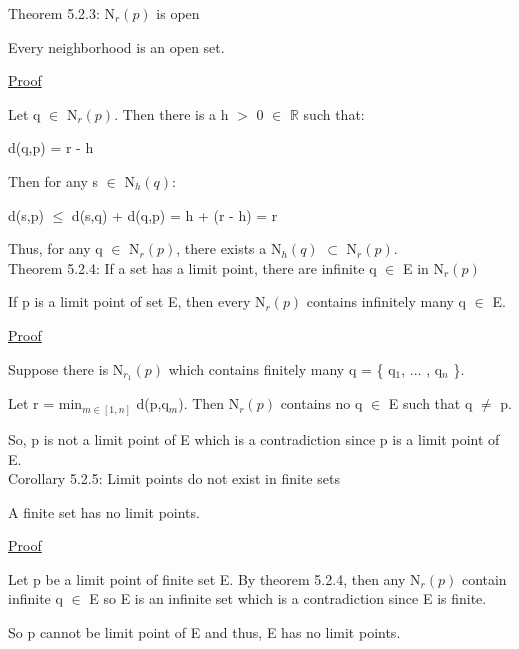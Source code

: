 { \color{red} Theorem 5.2.3: N$_r(p)$ is open } 

	\begin{adjustbox}{minipage=14cm, right}
		Every neighborhood is an open set.
	\end{adjustbox}

{ \color{magenta} \underline{Proof} } 
	
	Let q $\in$ N$_r(p)$. Then there is a h $>$ 0 $\in$ $\mathbb{R}$ such that:

	\qquad d(q,p) = r - h

	Then for any s $\in$ N$_h(q)$:

	\qquad d(s,p) $\leq$  d(s,q) + d(q,p) = h + (r - h) = r

	Thus, for any q $\in$ N$_r(p)$, there exists a N$_h(q)$ $\subset$ N$_r(p)$. \\

{ \color{red} Theorem 5.2.4: If a set has a limit point, there are infinite q
$\in$ E in N$_r(p)$ } 
	
	\begin{adjustbox}{minipage=14cm, right}
		If p is a limit point of set E, then every N$_r(p)$ contains infinitely many q $\in$ E.
	\end{adjustbox}

{ \color{magenta} \underline{Proof} } 
	
	Suppose there is N$_{r_1}(p)$ which contains finitely many q = \{ q$_1$, ... , q$_n$ \}.

	Let r = min$_{m \in [1,n]}$ d(p,q$_m$). Then N$_r(p)$ contains no q $\in$ E such that q $\not =$ p.

	So, p is not a limit point of E which is a contradiction since p is a limit point of E. \\

{ \color{orange} Corollary 5.2.5: Limit points do not exist in finite sets } 
	
	\begin{adjustbox}{minipage=14cm, right}
		A finite set has no limit points.
	\end{adjustbox}

{ \color{magenta} \underline{Proof} } 

	Let p be a limit point of finite set E. By {\color{red} theorem 5.2.4}, 
	then any N$_r(p)$ contain infinite q $\in$ E so E is an infinite set
	which is a contradiction since E is finite.

	So p cannot be limit point of E and thus, E has no limit points. \\

